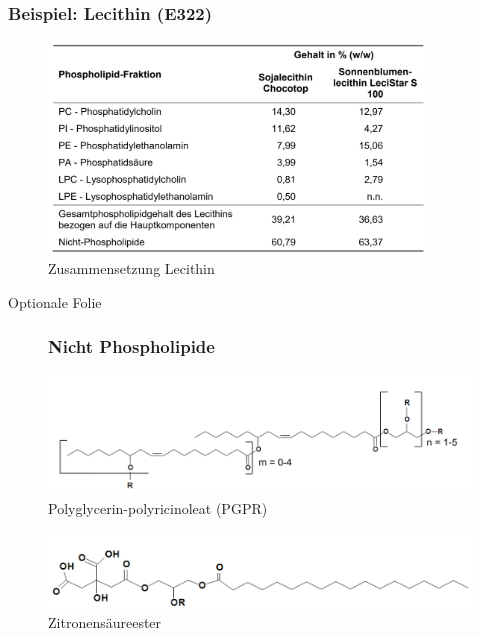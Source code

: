 \documentclass{beamer} %
\begin{document}
\begin{frame}
\frametitle{Beispiel: Lecithin (E322)}
\begin{figure}
\centering
\includegraphics[width = 0.9\textwidth]{ZusammensetzungLecithin.JPG}
\caption{Zusammensetzung Lecithin}
\end{figure}
\end{frame}

\begin{frame}
Optionale Folie
\begin{figure}
\frametitle{Nicht Phospholipide}
\centering
\includegraphics[width = 1\textwidth]{PGPR.JPG}
\caption{Polyglycerin-polyricinoleat (PGPR)}
\end{figure}
\begin{figure}
\centering
\includegraphics[width = 1\textwidth]{Zitronensaureester.JPG}
\caption{Zitronensäureester}
\end{figure}
\end{frame}
\end{document}
